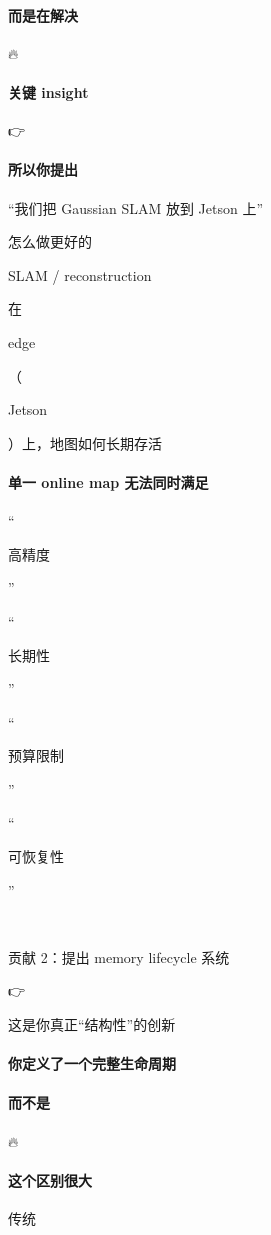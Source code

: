 \documentclass[12pt]{article}
\begin{document}
\paragraph{而是在解决}
🔥

\paragraph{关键 insight}
👉

\paragraph{所以你提出}
“我们把 Gaussian SLAM 放到 Jetson 上”

怎么做更好的

SLAM / reconstruction

在

edge

（

Jetson

）上，地图如何⻓期存活

\paragraph{单一 online map 无法同时满足}
“

高精度

”

“

长期性

”

“

预算限制

”

“

可恢复性

”

🥈

贡献 2：提出 memory lifecycle 系统

👉

这是你真正“结构性”的创新

\paragraph{你定义了一个完整生命周期}
\paragraph{而不是}
🔥

\paragraph{这个区别很大}
传统
\end{document}

